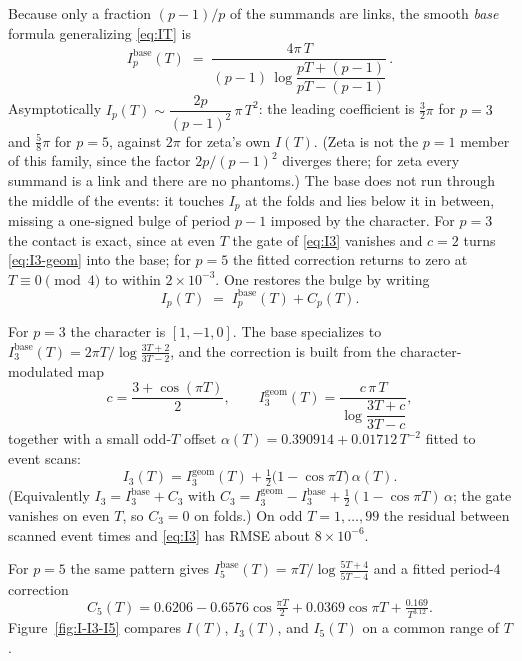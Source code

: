 \documentclass[11pt]{article}
\theoremstyle{definition}
\begin{document}
Because only a fraction $(p-1)/p$ of the summands are links, the smooth
\emph{base} formula generalizing \eqref{eq:IT} is
\begin{equation}\label{eq:Ip-base}
I_p^{\mathrm{base}}(T)
\;=\;
\frac{4\pi\,T}{(p-1)\,\log\dfrac{pT+(p-1)}{pT-(p-1)}}\,.
\end{equation}
Asymptotically $I_p(T)\sim\dfrac{2p}{(p-1)^{2}}\,\pi\,T^{2}$: the leading
coefficient is $\tfrac32\pi$ for $p=3$ and $\tfrac58\pi$ for $p=5$, against
$2\pi$ for zeta's own $I(T)$. (Zeta is not the $p=1$ member of this family,
since the factor $2p/(p-1)^2$ diverges there; for zeta every summand is a
link and there are no phantoms.) The base does not run through the middle of the
events: it touches $I_p$ at the folds and lies below it in between, missing a
one-signed bulge of period $p-1$ imposed by the character. For $p=3$ the
contact is exact, since at even $T$ the gate of \eqref{eq:I3} vanishes and
$c=2$ turns \eqref{eq:I3-geom} into the base; for $p=5$ the fitted correction
returns to zero at $T\equiv0\pmod4$ to within $2\times10^{-3}$. One restores
the bulge by writing
\begin{equation}\label{eq:Ip-split}
I_p(T)
\;=\;
I_p^{\mathrm{base}}(T)+C_p(T).
\end{equation}

For $p=3$ the character is $[1,-1,0]$. The base specializes to
$I_3^{\mathrm{base}}(T)=2\pi T\big/\log\frac{3T+2}{3T-2}$, and the
correction is built from the character-modulated map
\begin{equation}\label{eq:I3-geom}
c=\frac{3+\cos(\pi T)}{2},
\qquad
I_3^{\mathrm{geom}}(T)
=\frac{c\,\pi\,T}{\log\dfrac{3T+c}{3T-c}},
\end{equation}
together with a small odd-$T$ offset
$\alpha(T)=0.390914+0.01712\,T^{-2}$ fitted to event scans:
\begin{equation}\label{eq:I3}
I_3(T)
=
I_3^{\mathrm{geom}}(T)
+\tfrac12\bigl(1-\cos\pi T\bigr)\,\alpha(T).
\end{equation}
(Equivalently $I_3=I_3^{\mathrm{base}}+C_3$ with
$C_3=I_3^{\mathrm{geom}}-I_3^{\mathrm{base}}
+\tfrac12(1-\cos\pi T)\,\alpha$; the gate vanishes on even $T$, so
$C_3=0$ on folds.) On odd $T=1,\ldots,99$ the residual between scanned
event times and \eqref{eq:I3} has RMSE about $8\times10^{-6}$.

For $p=5$ the same pattern gives
$I_5^{\mathrm{base}}(T)=\pi T\big/\log\frac{5T+4}{5T-4}$ and a fitted
period-$4$ correction
\begin{equation}\label{eq:I5}
C_5(T)
=
0.6206-0.6576\cos\tfrac{\pi T}{2}
+0.0369\cos\pi T+\tfrac{0.169}{T^{3.12}}.
\end{equation}
Figure~\ref{fig:I-I3-I5} compares $I(T)$, $I_3(T)$, and $I_5(T)$ on a common
range of $T$.
\end{document}
